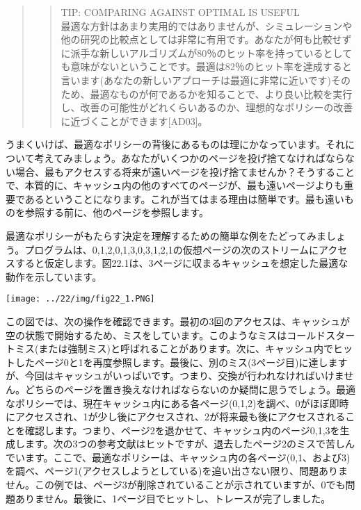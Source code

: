 \begin{quote}
\begin{quote}
TIP: COMPARING AGAINST OPTIMAL IS USEFUL\\
最適な方針はあまり実用的ではありませんが、シミュレーションや他の研究の比較点としては非常に有用です。あなたが何も比較せずに派手な新しいアルゴリズムが80％のヒット率を持っているとしても意味がないということです。最適は82％のヒット率を達成すると言います(あなたの新しいアプローチは最適に非常に近いです)そのため、最適なものが何であるかを知ることで、より良い比較を実行し、改善の可能性がどれくらいあるのか、理想的なポリシーの改善に近づくことができます{[}AD03{]}。
\end{quote}
\end{quote}

うまくいけば、最適なポリシーの背後にあるものは理にかなっています。それについて考えてみましょう。あなたがいくつかのページを投げ捨てなければならない場合、最もアクセスする将来が遠いページを投げ捨てませんか？そうすることで、本質的に、キャッシュ内の他のすべてのページが、最も遠いページよりも重要であるということになります。これが当てはまる理由は簡単です。最も遠いものを参照する前に、他のページを参照します。

最適なポリシーがもたらす決定を理解するための簡単な例をたどってみましょう。プログラムは、0,1,2,0,1,3,0,3,1,2,1の仮想ページの次のストリームにアクセスすると仮定します。図22.1は、3ページに収まるキャッシュを想定した最適な動作を示しています。

\texttt{[image: ../22/img/fig22\_1.PNG]}

この図では、次の操作を確認できます。最初の3回のアクセスは、キャッシュが空の状態で開始するため、ミスをしています。このようなミスはコールドスタートミス(または強制ミス)と呼ばれることがあります。次に、キャッシュ内でヒットしたページ0と1を再度参照します。最後に、別のミス(3ページ目)に達しますが、今回はキャッシュがいっぱいです。つまり、交換が行われなければいけません。どちらのページを置き換えなければならないのか疑問に思うでしょう。最適なポリシーでは、現在キャッシュ内にある各ページ(0,1,2)を調べ、0がほぼ即時にアクセスされ、1が少し後にアクセスされ、2が将来最も後にアクセスされることを確認します。つまり、ページ2を退かせて、キャッシュ内のページ0,1,3を生成します。次の3つの参考文献はヒットですが、退去したページ2のミスで苦しんでいます。ここで、最適なポリシーは、キャッシュ内の各ページ(0,1、および3)を調べ、ページ1(アクセスしようとしている)を追い出さない限り、問題ありません。この例では、ページ3が削除されていることが示されていますが、0でも問題ありません。最後に、1ページ目でヒットし、トレースが完了しました。

